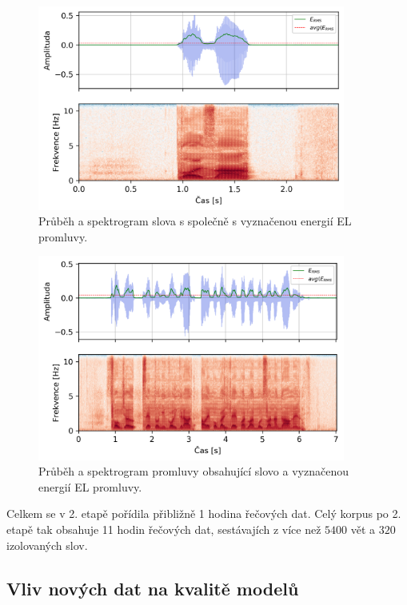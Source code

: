 \begin{figure}[hbpt]
  \centering
  \includegraphics[width=0.9\textwidth]{./ch4-experiments/img/energy_spec_word.png}
  \caption{Průběh a spektrogram slova  s společně s vyznačenou energií EL promluvy.}
  \label{fig:experiments:normalization:word}
\end{figure}

\begin{figure}[hbpt]
  \centering
  \includegraphics[width=0.9\textwidth]{./ch4-experiments/img/energy_spec_sentence.png}
  \caption{Průběh a spektrogram promluvy obsahující slovo  a vyznačenou energií EL promluvy.}
  \label{fig:experiments:normalization:sentence}
\end{figure}

Celkem se v 2. etapě pořídila přibližně 1 hodina řečových dat. Celý korpus po 2. etapě tak obsahuje 11 hodin řečových dat, sestávajích z více než $5400$ vět a $320$ izolovaných slov.

\subsection{Vliv nových dat na kvalitě modelů}
\label{chap:experiments:normalization:corpus}

